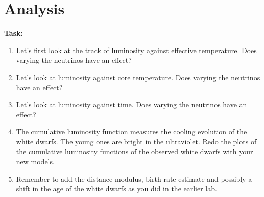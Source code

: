 \documentclass{article}
\begin{document}
\section{Analysis}

\textbf{Task:}\vspace{-1em}
\begin{enumerate}
 \setlength\itemsep{0em}
\item Let's first look at the track of luminosity against effective temperature.  Does varying the neutrinos have an effect?
\item Let's look at luminosity against core temperature.  Does varying the neutrinos have an effect?
\item Let's look at luminosity against time.  Does varying the neutrinos have an effect?
 \item 
 The cumulative luminosity function measures the cooling evolution of the white dwarfs.  The young ones are bright in the ultraviolet.  Redo the plots of the cumulative luminosity functions of the observed white dwarfs with your new models. 
 \item Remember to add the distance modulus, birth-rate estimate and possibly a shift in the age of the white dwarfs as you did in the earlier lab.
\end{enumerate}
\end{document}
